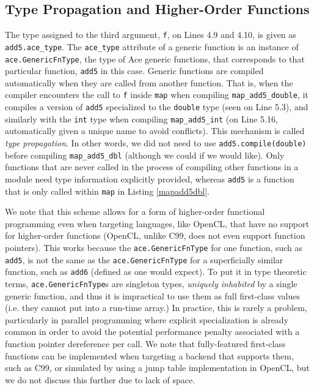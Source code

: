 \documentclass{sig-alternate}
\begin{document}
\subsection{Type Propagation and Higher-Order Functions}
The type assigned to the third argument, \verb|f|, on Lines 4.9 and 4.10, is given as \verb|add5.ace_type|. The \verb|ace_type| attribute of a generic function is an instance of \verb|ace.GenericFnType|, the type of Ace generic functions, that corresponds to that particular function, \verb|add5| in this case. Generic functions are compiled automatically when they are called from another function. That is, when the compiler encounters the call to \verb|f| inside \verb|map| when compiling \verb|map_add5_double|, it compiles a version of \verb|add5| specialized to the \verb|double| type (seen on Line 5.3), and similarly with the \verb|int| type when compiling \verb|map_add5_int| (on Line 5.16, automatically given a unique name to avoid conflicts). This mechanism is called {\em type propagation}. In other words, we did not need to use \verb|add5.compile(double)| before compiling \verb|map_add5_dbl| (although we could if we would like). Only functions that are never called in the process of compiling other functions in a module need type information explicitly provided, whereas \verb|add5| is a function that is only called within \verb|map| in Listing \ref{mapadd5dbl}. 

We note that this scheme allows for a form of higher-order functional programming even when targeting languages, like OpenCL, that have no support for higher-order functions (OpenCL, unlike C99, does not even support function pointers). This works because the \verb|ace.GenericFnType| for one function, such as \verb|add5|, is not the same as the \verb|ace.GenericFnType| for a superficially similar function, such as \verb|add6| (defined as one would expect). To put it in type theoretic terms, \verb|ace.GenericFnType|s are singleton types, {\em uniquely inhabited} by a single generic function, and thus it is impractical to use them as full first-class values (i.e. they cannot put into a run-time array.) In practice, this is rarely a problem, particularly in parallel programming where explicit specialization is already common in order to avoid the potential performance penalty associated with a function pointer dereference per call.
We note that fully-featured first-class functions can be implemented when targeting a backend that supports them, such as C99, or simulated by using a jump table implementation in OpenCL, but we do not discuss this further due to lack of space.
\end{document}
